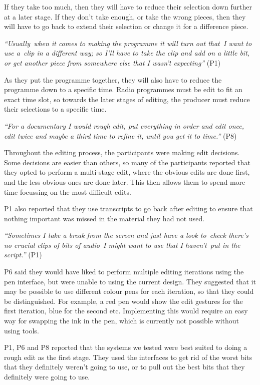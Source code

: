 If they take too much, then they will have to reduce their selection down further at a later stage. If they don't take
enough, or take the wrong pieces, then they will have to go back to extend their selection or change it for a
difference piece.

\textit{``Usually when it comes to making the programme it will turn out that I want to use a clip in a different way;
  so I'll have to take the clip and add on a little bit, or get another piece from somewhere else that I wasn't
expecting''} (P1)

As they put the programme together, they will also have to reduce the programme down to a specific time. Radio
programmes must be edit to fit an exact time slot, so towards the later stages of editing, the producer must reduce
their selections to a specific time.

\textit{``For a documentary I would rough edit, put everything in order and edit once, edit twice and maybe a third
time to refine it, until you get it to time.''} (P8)

Throughout the editing process, the participants were making edit decisions. Some decisions are easier than others, so
many of the participants reported that they opted to perform a multi-stage edit, where the obvious edits are done
first, and the less obvious ones are done later. This then allows them to spend more time focussing on the most
difficult edits.

P1 also reported that they use transcripts to go back after editing to ensure that nothing important was missed in the
material they had not used.

\textit{``Sometimes I take a break from the screen and just have a look to check there's no crucial clips of bits of
audio I might want to use that I haven't put in the script.''} (P1)

P6 said they would have liked to perform multiple editing iterations using the pen interface, but were unable to using
the current design. They suggested that it may be possible to use different colour pens for each iteration, so that
they could be distinguished. For example, a red pen would show the edit gestures for the first iteration, blue for the
second etc. Implementing this would require an easy way for swapping the ink in the pen, which is currently not
possible without using tools.

P1, P6 and P8 reported that the systems we tested were best suited to doing a rough edit as the first stage.  They used
the interfaces to get rid of the worst bits that they definitely weren't going to use, or to pull out the best bits
that they definitely were going to use.

